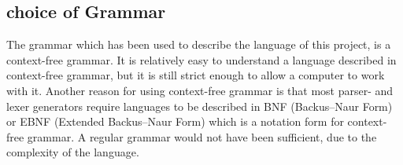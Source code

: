 \subsection{choice of Grammar}
The grammar which has been used to describe the language of this project, is a context-free grammar. It is relatively easy to understand a language described in context-free grammar, but it is still strict enough to allow a computer to work with it. Another reason for using context-free grammar is that most parser- and lexer generators require languages to be described in BNF (Backus–Naur Form) or EBNF (Extended Backus–Naur Form) which is a notation form for context-free grammar. A regular grammar would not have been sufficient, due to the complexity of the language.
